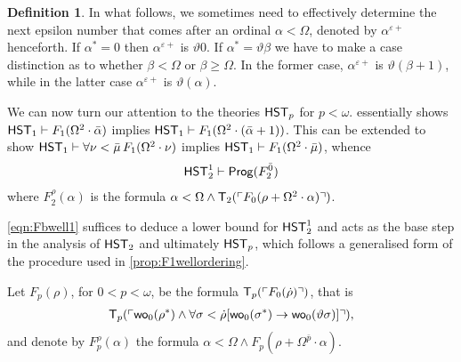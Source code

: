 \documentclass[UKenglish,cleveref,DIV=12]{scrartcl}
\theoremstyle{definition}
\newtheorem{definition}[lemma]{Definition}
\theoremstyle{definition}
\begin{document}
\begin{definition}\label{nextepsilon}
In what follows, we sometimes need to effectively determine the next epsilon number that comes after an ordinal $\alpha<\Omega$, denoted by $\alpha^{\varepsilon+}$ henceforth. 
If $\alpha^*=0$ then  $\alpha^{\varepsilon+}$ is $\vartheta 0$. If $\alpha^*=\vartheta\beta$ we have to make a case distinction as to whether $\beta<\Omega$ or $\beta\geq\Omega$. 
In the former case, $\alpha^{\varepsilon+}$  is $\vartheta(\beta+1)$, while in the latter case  $\alpha^{\varepsilon+}$  is $\vartheta(\alpha)$.
\end{definition}

We can now turn our attention to the theories $\mathsf{HST}_p$ for $p<\omega$.
 essentially shows $\mathsf{HST}_1\vdash
F_1(\Omega^2\cdot\bar\alpha)$ implies $\mathsf{HST}_1\vdash
F_1(\Omega^2\cdot(\bar\alpha+1))$. This can be extended to show $\mathsf{HST}_1\vdash\forall\nu<\bar\mu\,F_1(\Omega^2\cdot\nu)$ implies $\mathsf{HST}_1\vdash F_1(\Omega^2\cdot\bar\mu)$, whence
\begin{gather}\label{eqn:Fbwell1}
  \mathsf{HST}_2^1\vdash \mathsf{Prog}  (F^{\bar 0}_2)
\end{gather}
where $F_2^{\rho}(\alpha)$ is the formula $\alpha<\Omega\land\mathsf{T}_2(\ulcorner{F_0(\rho+\Omega^2\cdot\alpha)}\urcorner)$.

\eqref{eqn:Fbwell1} suffices to deduce a lower bound for $\mathsf{HST}_2^1$ and acts as
the base step in the analysis of $\mathsf{HST}_2$ and ultimately $\mathsf{HST}_p$, which follows a
generalised form of the procedure used in \cref{prop:F1wellordering}.

Let $F_p(\rho)$, for $0<p<\omega$, be the formula $\mathsf{T}_p(\ulcorner{F_0(\dot\rho)}\urcorner)$, that is
\begin{align*}
 \mathsf{T}_{p}(\ulcorner{\mathsf{wo}_0(\rho^*)\land\forall\sigma<\dot\rho [\mathsf{wo}_0(\sigma^*)\rightarrow\mathsf{wo}_0(\vartheta\sigma)]}\urcorner),
\end{align*}
and denote by $F_p^\rho(\alpha)$ the formula $\alpha<\Omega\land F_p(\rho+\Omega^{\bar p}\cdot\alpha)$.
\end{document}
